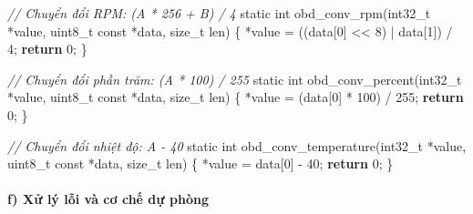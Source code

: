 \documentclass[a4paper]{extarticle}
\newenvironment{Shaded}{}{}
\newcommand{\CommentTok}[1]{\textcolor[rgb]{0.38,0.63,0.69}{\textit{#1}}}
\newcommand{\ControlFlowTok}[1]{\textcolor[rgb]{0.00,0.44,0.13}{\textbf{#1}}}
\newcommand{\DataTypeTok}[1]{\textcolor[rgb]{0.56,0.13,0.00}{#1}}
\newcommand{\DecValTok}[1]{\textcolor[rgb]{0.25,0.63,0.44}{#1}}
\newcommand{\NormalTok}[1]{#1}
\newcommand{\OperatorTok}[1]{\textcolor[rgb]{0.40,0.40,0.40}{#1}}
\begin{document}
\begin{Shaded}
\begin{Highlighting}[]
\CommentTok{// Chuyển đổi RPM: (A * 256 + B) / 4}
\DataTypeTok{static} \DataTypeTok{int}\NormalTok{ obd\_conv\_rpm}\OperatorTok{(}\DataTypeTok{int32\_t} \OperatorTok{*}\NormalTok{value}\OperatorTok{,} \DataTypeTok{uint8\_t} \DataTypeTok{const} \OperatorTok{*}\NormalTok{data}\OperatorTok{,} \DataTypeTok{size\_t}\NormalTok{ len}\OperatorTok{)}
\OperatorTok{\{}
    \OperatorTok{*}\NormalTok{value }\OperatorTok{=} \OperatorTok{((}\NormalTok{data}\OperatorTok{[}\DecValTok{0}\OperatorTok{]} \OperatorTok{\textless{}\textless{}} \DecValTok{8}\OperatorTok{)} \OperatorTok{|}\NormalTok{ data}\OperatorTok{[}\DecValTok{1}\OperatorTok{])} \OperatorTok{/} \DecValTok{4}\OperatorTok{;}
    \ControlFlowTok{return} \DecValTok{0}\OperatorTok{;}
\OperatorTok{\}}

\CommentTok{// Chuyển đổi phần trăm: (A * 100) / 255}
\DataTypeTok{static} \DataTypeTok{int}\NormalTok{ obd\_conv\_percent}\OperatorTok{(}\DataTypeTok{int32\_t} \OperatorTok{*}\NormalTok{value}\OperatorTok{,} \DataTypeTok{uint8\_t} \DataTypeTok{const} \OperatorTok{*}\NormalTok{data}\OperatorTok{,} \DataTypeTok{size\_t}\NormalTok{ len}\OperatorTok{)}
\OperatorTok{\{}
    \OperatorTok{*}\NormalTok{value }\OperatorTok{=} \OperatorTok{(}\NormalTok{data}\OperatorTok{[}\DecValTok{0}\OperatorTok{]} \OperatorTok{*} \DecValTok{100}\OperatorTok{)} \OperatorTok{/} \DecValTok{255}\OperatorTok{;}
    \ControlFlowTok{return} \DecValTok{0}\OperatorTok{;}
\OperatorTok{\}}

\CommentTok{// Chuyển đổi nhiệt độ: A {-} 40}
\DataTypeTok{static} \DataTypeTok{int}\NormalTok{ obd\_conv\_temperature}\OperatorTok{(}\DataTypeTok{int32\_t} \OperatorTok{*}\NormalTok{value}\OperatorTok{,} \DataTypeTok{uint8\_t} \DataTypeTok{const} \OperatorTok{*}\NormalTok{data}\OperatorTok{,} \DataTypeTok{size\_t}\NormalTok{ len}\OperatorTok{)}
\OperatorTok{\{}
    \OperatorTok{*}\NormalTok{value }\OperatorTok{=}\NormalTok{ data}\OperatorTok{[}\DecValTok{0}\OperatorTok{]} \OperatorTok{{-}} \DecValTok{40}\OperatorTok{;}
    \ControlFlowTok{return} \DecValTok{0}\OperatorTok{;}
\OperatorTok{\}}
\end{Highlighting}
\end{Shaded}

\paragraph{f) Xử lý lỗi và
cơ chế dự phòng}\label{f-xux1eed-luxfd-lux1ed7i-vuxe0-fallback}
\end{document}
